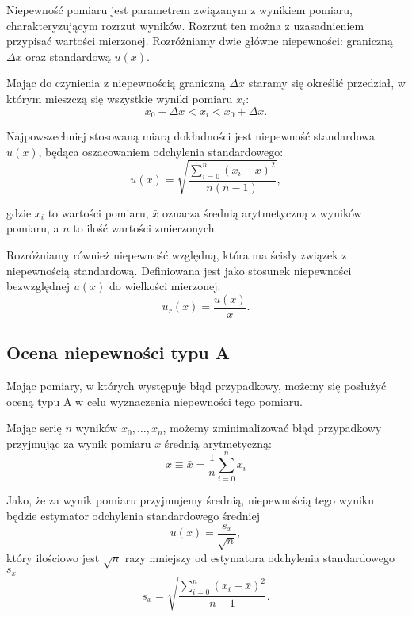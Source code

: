 \documentclass[12pt,a4paper]{article}
\numberwithin{equation}{section}
\begin{document}
Niepewność pomiaru jest parametrem związanym z wynikiem pomiaru, charakteryzującym rozrzut wyników. Rozrzut ten można z uzasadnieniem przypisać wartości mierzonej. Rozróżniamy dwie główne niepewności: graniczną $\Delta x$ oraz standardową $u(x)$.

Mając do czynienia z niepewnością graniczną $\Delta x$ staramy się określić przedział, w którym mieszczą się wszystkie wyniki pomiaru $x_i$:
\begin{equation}
	x_0 - \Delta x < x_i < x_0 + \Delta x.
\end{equation}

Najpowszechniej stosowaną miarą dokładności jest niepewność standardowa $u(x)$, będąca oszacowaniem odchylenia standardowego:
\begin{equation}
	u(x) = \sqrt{\frac{\sum_{i = 0}^n(x_i - \bar{x})^2}{n(n-1)}},
	\label{eq:std_uncert}
\end{equation}

gdzie $x_i$ to wartości pomiaru, $\bar{x}$ oznacza średnią arytmetyczną z wyników pomiaru, a $n$ to ilość wartości zmierzonych.

Rozróżniamy również niepewność względną, która ma ścisły związek z niepewnością standardową. Definiowana jest jako stosunek niepewności bezwzględnej $u(x)$ do wielkości mierzonej:
\begin{equation}
	u_r(x) = \frac{u(x)}{x}.
\end{equation}

\subsection{Ocena niepewności typu A}

Mając pomiary, w których występuje błąd przypadkowy, możemy się posłużyć oceną typu A w celu wyznaczenia niepewności tego pomiaru. 

Mając serię $n$ wyników $x_0, \ldots, x_n$, możemy zminimalizować błąd przypadkowy przyjmując za wynik pomiaru $x$ średnią arytmetyczną:
\begin{equation}
	x \equiv \bar{x} = \frac{1}{n}\sum_{i = 0}^{n}x_i
\end{equation}

Jako, że za wynik pomiaru przyjmujemy średnią, niepewnością tego wyniku będzie estymator odchylenia standardowego średniej
\begin{equation}
	u(x) = \frac{s_x}{\sqrt{n}},
	\label{eq:uncert_sx}
\end{equation}
który ilościowo jest $\sqrt{n}$ razy mniejszy od estymatora odchylenia standardowego $s_x$
\begin{equation}
	s_x = \sqrt{\frac{\sum_{i = 0}^n(x_i - \bar{x})^2}{n-1}}.
	\label{eq:sx}
\end{equation}
\end{document}
